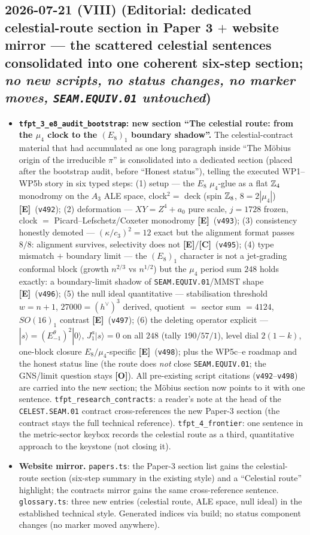 \documentclass[11pt]{article}
\providecommand{\mE}{\textbf{[E]}}\providecommand{\mC}{\textbf{[C]}}
\providecommand{\mO}{\textbf{[O]}}\providecommand{\mX}{\textbf{[X]}}
\providecommand{\cthree}{c_3}\providecommand{\phiz}{\varphi_0^{\mathrm{ret}}}
\begin{document}
\subsection*{2026-07-21 (VIII) (Editorial: dedicated celestial-route section in Paper 3 $+$ website mirror --- the scattered celestial sentences consolidated into one coherent six-step section; \emph{no new scripts, no status changes, no marker moves, \texttt{SEAM.EQUIV.01} untouched})}
\begin{itemize}[leftmargin=1.5em]
\item \textbf{\texttt{tfpt\_3\_e8\_audit\_bootstrap}: new section ``The celestial route: from the
$\mu_4$ clock to the $(E_8)_1$ boundary shadow''.} The celestial-contract material that had accumulated
as one long paragraph inside ``The M\"obius origin of the irreducible $\pi$'' is consolidated into a
dedicated section (placed after the bootstrap audit, before ``Honest status''), telling the executed
WP1--WP5b story in six typed steps: (1) setup --- the $E_8$ $\mu_4$-glue as a flat $\mathbb{Z}_4$ monodromy on
the $A_3$ ALE space, clock$^2=$ deck (spin $\mathbb{Z}_8$, $8=2|\mu_4|$) \mE\ (\texttt{v492}); (2) deformation
--- $XY=Z^4{+}a_0$ pure scale, $j=1728$ frozen, clock $=$ Picard--Lefschetz/Coxeter monodromy \mE\
(\texttt{v493}); (3) consistency honestly demoted --- $(\kappa/\cthree)^2=12$ exact but the alignment
format passes $8/8$: alignment survives, selectivity does not \mE/\mC\ (\texttt{v495}); (4) type
mismatch $+$ boundary limit --- the $(E_8)_1$ character is not a jet-grading conformal block (growth
$n^{2/3}$ vs $n^{1/2}$) but the $\mu_4$ period sum $248$ holds exactly: a boundary-limit shadow of
\texttt{SEAM.EQUIV.01}/MMST shape \mE\ (\texttt{v496}); (5) the null ideal quantitative --- stabilisation
threshold $w=n{+}1$, $27000=(h^\vee)^3$ derived, quotient $=$ sector sum $=4124$, $SO(16)_1$ contrast
\mE\ (\texttt{v497}); (6) the deleting operator explicit --- $|s\rangle=(E^\theta_{-1})^2|0\rangle$,
$J^a_1|s\rangle=0$ on all $248$ (tally $190/57/1$), level dial $2(1{-}k)$, one-block closure
$E_8/\mu_4$-specific \mE\ (\texttt{v498}); plus the WP5c--e roadmap and the honest status line (the route
does \emph{not} close \texttt{SEAM.EQUIV.01}; the GNS/limit question stays \mO). All pre-existing script
citations (\texttt{v492}--\texttt{v498}) are carried into the new section; the M\"obius section now
points to it with one sentence. \texttt{tfpt\_research\_contracts}: a reader's note at the head of the \texttt{CELEST.SEAM.01}
contract cross-references the new Paper-3 section (the contract stays the full technical reference).
\texttt{tfpt\_4\_frontier}: one sentence in the metric-sector keybox records the celestial route as a
third, quantitative approach to the keystone (not closing it).
\item \textbf{Website mirror.} \texttt{papers.ts}: the Paper-3 section list gains the celestial-route
section (six-step summary in the existing style) and a ``Celestial route'' highlight; the contracts
mirror gains the same cross-reference sentence. \texttt{glossary.ts}: three new entries (celestial
route, ALE space, null ideal) in the established technical style. Generated indices via build; no
status component changes (no marker moved anywhere).
\end{itemize}
\end{document}
